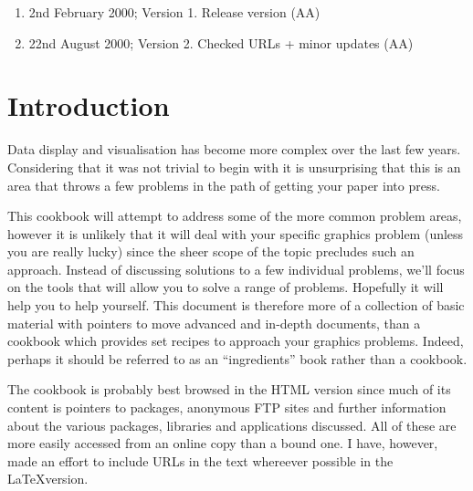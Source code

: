 \documentclass[twoside,11pt]{starlink}
\begin{document}
\scfrontmatter



\begin{enumerate}
  \item 2nd February 2000; Version 1. Release version (AA)
  \item 22nd August 2000; Version 2. Checked URLs + minor updates (AA)

\end{enumerate}

\cleardoublepage
\newpage


\section{Introduction\label{sc15_intro}}

Data display and visualisation has become more complex over the last
few years. Considering that it was not trivial to begin with it is
unsurprising that this is an area that throws a few problems in the
path of getting your paper into press.

This cookbook will attempt to address some of the more common problem
areas, however it is unlikely that it will deal with your specific
graphics problem (unless you are really lucky) since the sheer scope
of the topic precludes such an approach. Instead of discussing
solutions to a few individual problems, we'll focus on the tools that
will allow you to solve a range of problems. Hopefully it will help
you to help yourself. This document is therefore more of a collection
of basic material with pointers to move advanced and in-depth
documents, than a cookbook which provides set recipes to approach your
graphics problems. Indeed, perhaps it should be referred to as an
``ingredients'' book rather than a cookbook.

The cookbook is probably best browsed in the HTML version since much
of its content is pointers to packages, anonymous FTP sites and
further information about the various packages, libraries and
applications discussed. All of these are more easily accessed from an
online copy than a bound one. I have, however, made an effort to
include URLs in the text whereever possible in the \LaTeX version.
\end{document}
